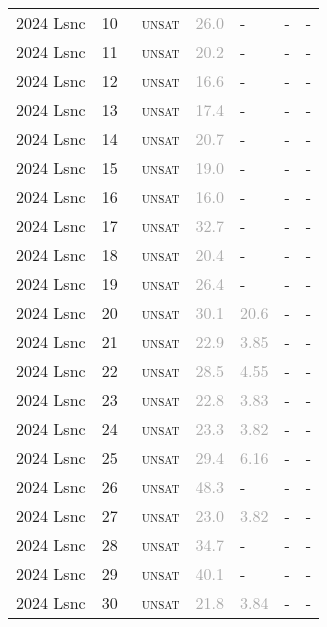 \begin{center}
{\begin{longtable}{@{}lllllll@{}}
2024 Lsnc & 10 & ~\textsc{unsat} & \textcolor{darkgray}{26.0} & - & - & - \\
2024 Lsnc & 11 & ~\textsc{unsat} & \textcolor{darkgray}{20.2} & - & - & - \\
2024 Lsnc & 12 & ~\textsc{unsat} & \textcolor{darkgray}{16.6} & - & - & - \\
2024 Lsnc & 13 & ~\textsc{unsat} & \textcolor{darkgray}{17.4} & - & - & - \\
2024 Lsnc & 14 & ~\textsc{unsat} & \textcolor{darkgray}{20.7} & - & - & - \\
2024 Lsnc & 15 & ~\textsc{unsat} & \textcolor{darkgray}{19.0} & - & - & - \\
2024 Lsnc & 16 & ~\textsc{unsat} & \textcolor{darkgray}{16.0} & - & - & - \\
2024 Lsnc & 17 & ~\textsc{unsat} & \textcolor{darkgray}{32.7} & - & - & - \\
2024 Lsnc & 18 & ~\textsc{unsat} & \textcolor{darkgray}{20.4} & - & - & - \\
2024 Lsnc & 19 & ~\textsc{unsat} & \textcolor{darkgray}{26.4} & - & - & - \\
2024 Lsnc & 20 & ~\textsc{unsat} & \textcolor{darkgray}{30.1} & \textcolor{darkgray}{20.6} & - & - \\
2024 Lsnc & 21 & ~\textsc{unsat} & \textcolor{darkgray}{22.9} & \textcolor{darkgray}{3.85} & - & - \\
2024 Lsnc & 22 & ~\textsc{unsat} & \textcolor{darkgray}{28.5} & \textcolor{darkgray}{4.55} & - & - \\
2024 Lsnc & 23 & ~\textsc{unsat} & \textcolor{darkgray}{22.8} & \textcolor{darkgray}{3.83} & - & - \\
2024 Lsnc & 24 & ~\textsc{unsat} & \textcolor{darkgray}{23.3} & \textcolor{darkgray}{3.82} & - & - \\
2024 Lsnc & 25 & ~\textsc{unsat} & \textcolor{darkgray}{29.4} & \textcolor{darkgray}{6.16} & - & - \\
2024 Lsnc & 26 & ~\textsc{unsat} & \textcolor{darkgray}{48.3} & - & - & - \\
2024 Lsnc & 27 & ~\textsc{unsat} & \textcolor{darkgray}{23.0} & \textcolor{darkgray}{3.82} & - & - \\
2024 Lsnc & 28 & ~\textsc{unsat} & \textcolor{darkgray}{34.7} & - & - & - \\
2024 Lsnc & 29 & ~\textsc{unsat} & \textcolor{darkgray}{40.1} & - & - & - \\
2024 Lsnc & 30 & ~\textsc{unsat} & \textcolor{darkgray}{21.8} & \textcolor{darkgray}{3.84} & - & - \\

\end{longtable}}
\end{center}
